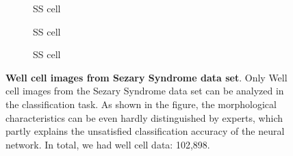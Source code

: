 \begin{figure}[ht]
\begin{center}
\begin{subfigure}[b]{0.25\textwidth}
			\label{fig:Outside FOV}
			\caption{SS cell}
		\end{subfigure}
		\begin{subfigure}[b]{0.25\textwidth}
			\label{fig:Contaminated}
			\caption{SS cell}
		\end{subfigure}
		\begin{subfigure}[b]{0.25\textwidth}
			\label{fig:Good Cell}
			\caption{SS cell}
		\end{subfigure}
		
	\end{center}
	\caption{\textbf{Well cell images from Sezary Syndrome data set}. Only Well cell images from the Sezary Syndrome data set can be analyzed in the classification task. As shown in the figure, the morphological characteristics can be even hardly distinguished by experts, which partly explains the unsatisfied classification accuracy of the neural network. In total, we had well cell data: 102,898.}
	\label{fig:4.5}
\end{figure}

